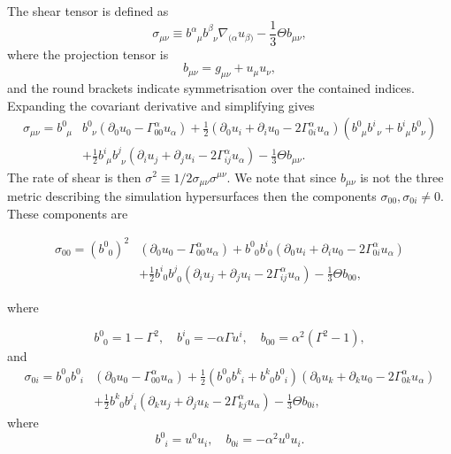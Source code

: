 \documentclass[a4paper]{article}
\newcommand{\ph}{\phantom}
\newcommand{\alp}{\alpha}
\newcommand{\Gam}{\Gamma}
\newcommand{\pd}{\partial}
\begin{document}
The shear tensor is defined as
\begin{equation}\label{eq:sigma_defn}
	\sigma_{\mu\nu} \equiv b^\alp_{\ph{\alp}\mu} b^\beta_{\ph{\beta}\nu} \nabla_{(\alp} u_{\beta)} - \frac{1}{3}\Theta b_{\mu\nu},
\end{equation}
where the projection tensor is 
\begin{equation}\label{eq:bproj}
	b_{\mu\nu}=g_{\mu\nu} + u_\mu u_\nu,
\end{equation}
and the round brackets indicate symmetrisation over the contained indices. Expanding the covariant derivative and simplifying gives
\begin{equation}
	\begin{aligned}
		\sigma_{\mu\nu} = b^0_{\ph{0}\mu} &b^0_{\ph{0}\nu}  \left( \pd_0 u_0 - \Gam^\alp_{00} u_\alp \right) + \frac{1}{2} \left( \pd_0 u_i + \pd_i u_0 - 2 \Gam^\alp_{0i} u_\alp \right) \left( b^0_{\ph{0}\mu} b^i_{\ph{0}\nu} + b^i_{\ph{i}\mu} b^0_{\ph{0}\nu} \right) \\
					& + \frac{1}{2} b^i_{\ph{i}\mu} b^j_{\ph{j}\nu} \left( \pd_i u_j + \pd_j u_i - 2 \Gam^\alp_{ij} u_\alp \right) - \frac{1}{3}\Theta b_{\mu\nu}.
	\end{aligned}
\end{equation}
The rate of shear is then $\sigma^2 \equiv 1/2 \sigma_{\mu\nu} \sigma^{\mu\nu}$. We note that since $b_{\mu\nu}$ is not the three metric describing the simulation hypersurfaces then the components $\sigma_{00}, \sigma_{0i} \neq 0$. These components are

\begin{equation}
	\begin{aligned}
		\sigma_{00} = \left(b^0_{\ph{0}0}\right)^2 &\left( \pd_0 u_0 - \Gam^\alp_{00} u_\alp \right) + b^0_{\ph{0}0} b^i_{\ph{i}0} \left( \pd_0 u_i + \pd_i u_0 - 2 \Gam^\alp_{0i} u_\alp \right) \\
		&+ \frac{1}{2} b^i_{\ph{i}0} b^j_{\ph{j}0} \left( \pd_i u_j + \pd_j u_i - 2 \Gam^\alp_{ij} u_\alp \right) - \frac{1}{3}\Theta b_{00},
	\end{aligned}
\end{equation}

where

\begin{equation}
	b^0_{\ph{0}0} = 1 - \Gam^2, \quad b^i_{\ph{i}0} = - \alp \Gam u^i, \quad b_{00} = \alp^2 \left( \Gam^2 - 1 \right),
\end{equation}
and
\begin{equation}
	\begin{aligned}
		\sigma_{0i} = b^0_{\ph{0}0} b^0_{\ph{0}i} &\left( \pd_0 u_0 - \Gam^\alp_{00} u_\alp \right) +  \frac{1}{2} \left( b^0_{\ph{0}0} b^k_{\ph{0}i} + b^k_{\ph{k}0} b^0_{\ph{0}i} \right) \left( \pd_0 u_k + \pd_k u_0 - 2 \Gam^\alp_{0k} u_\alp \right) \\
		&+ \frac{1}{2} b^k_{\ph{k}0} b^j_{\ph{j}i} \left( \pd_k u_j + \pd_j u_k - 2 \Gam^\alp_{kj} u_\alp \right) - \frac{1}{3}\Theta b_{0i},
	\end{aligned}
\end{equation}
where
\begin{equation}
	b^0_{\ph{0}i} = u^0 u_i, \quad b_{0i} = - \alp^2 u^0 u_i.
\end{equation}
\end{document}
